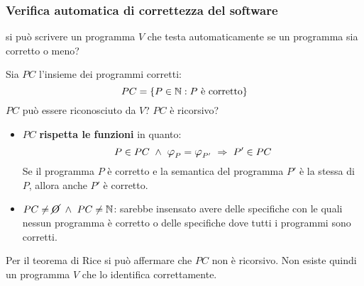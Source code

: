 \subsubsection*{Verifica automatica di correttezza del software}
\begin{description}[leftmargin=1.9cm]
    \item[Problema:] si può scrivere un programma $V$ che testa automaticamente se un programma
    sia corretto o meno?
\end{description}

Sia $PC$ l'insieme dei programmi corretti: $$ PC = \{P\in\mathbb{N}:\text{$P$ è corretto}\} $$
$PC$ può essere riconosciuto da $V$? $PC$ è ricorsivo?

\begin{itemize}
    \item $PC$ \textbf{rispetta le funzioni} in quanto:
    $$P\in PC \ \wedge\ \semRAM_P=\semRAM_{P'} \ \Rightarrow\ P'\in PC$$
    Se il programma $P$ è corretto e la semantica del programma $P'$ è la stessa di $P$, 
    allora anche $P'$ è corretto.
    \item $PC\neq\cancel{O}\ \wedge\ PC\neq\N$: sarebbe insensato avere delle specifiche con le
    quali nessun programma è corretto o delle specifiche dove tutti i programmi sono corretti.
\end{itemize}

Per il teorema di Rice si può affermare che $PC$ non è ricorsivo. Non esiste quindi un
programma $V$ che lo identifica correttamente.